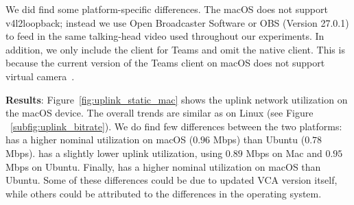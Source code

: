 We did find some platform-specific differences. The macOS does not support v4l2loopback; instead we use Open Broadcaster Software or OBS (Version 27.0.1) to feed in the same
talking-head video used throughout our experiments. In addition, we only include the \teamsbrowser client for Teams and omit the native client. This is because the current version of the Teams client on macOS does not support virtual camera~\cite{teams_virtual_camera}. 

\textbf{Results}: 
Figure~\ref{fig:uplink_static_mac} shows the uplink network utilization on the macOS device. The overall trends are similar as on Linux (see Figure 
~\ref{subfig:uplink_bitrate}). We do find few differences between the two platforms: %
\zoom has a higher nominal utilization on macOS ($0.96$ Mbps) than Ubuntu ($0.78$ Mbps). \meet has a 
slightly lower uplink utilization, using $0.89$ Mbps on Mac and $0.95$ Mbps on Ubuntu. Finally, \teamsbrowser has a higher
nominal utilization on macOS than Ubuntu. Some of these differences could be due to updated VCA version itself, while others could be attributed to the differences in the operating system. 


